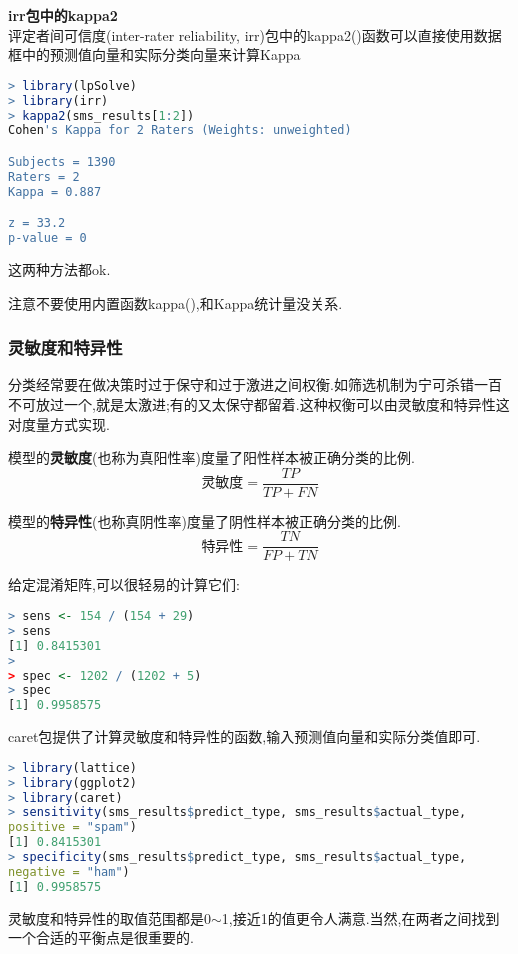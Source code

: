 \documentclass[11pt,a4paper,oneside]{book}
\begin{document}
\textbf{irr包中的kappa2}\\
评定者间可信度(inter-rater reliability, irr)包中的kappa2()函数可以直接使用数据框中的预测值向量和实际分类向量来计算Kappa
\begin{lstlisting}[language=r]
> library(lpSolve)
> library(irr)
> kappa2(sms_results[1:2])
Cohen's Kappa for 2 Raters (Weights: unweighted)

Subjects = 1390 
Raters = 2 
Kappa = 0.887 

z = 33.2 
p-value = 0 
\end{lstlisting}

这两种方法都ok.
\begin{tcolorbox}[colback=pink!10!white,colframe=pink!100!black]
注意不要使用内置函数kappa(),和Kappa统计量没关系.
\end{tcolorbox}

\subsubsection{灵敏度和特异性}
分类经常要在做决策时过于保守和过于激进之间权衡.如筛选机制为宁可杀错一百不可放过一个,就是太激进;有的又太保守都留着.这种权衡可以由灵敏度和特异性这对度量方式实现.

模型的\textbf{灵敏度}(也称为真阳性率)度量了阳性样本被正确分类的比例.
\begin{equation}
\mbox{灵敏度}=\frac{TP}{TP+FN}
\end{equation}

模型的\textbf{特异性}(也称真阴性率)度量了阴性样本被正确分类的比例.
\begin{equation}
	\mbox{特异性}=\frac{TN}{FP+TN}
\end{equation}

给定混淆矩阵,可以很轻易的计算它们:
\begin{lstlisting}[language=r]
> sens <- 154 / (154 + 29)
> sens
[1] 0.8415301
> 
> spec <- 1202 / (1202 + 5)
> spec
[1] 0.9958575
\end{lstlisting}

caret包提供了计算灵敏度和特异性的函数,输入预测值向量和实际分类值即可.
\begin{lstlisting}[language=r]
> library(lattice)
> library(ggplot2)
> library(caret)
> sensitivity(sms_results$predict_type, sms_results$actual_type, 
positive = "spam")
[1] 0.8415301
> specificity(sms_results$predict_type, sms_results$actual_type, 
negative = "ham")
[1] 0.9958575
\end{lstlisting}

灵敏度和特异性的取值范围都是0$ \sim $1,接近1的值更令人满意.当然,在两者之间找到一个合适的平衡点是很重要的.
\end{document}
